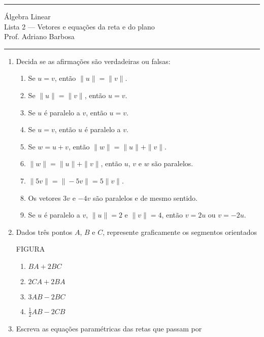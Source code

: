 \documentclass{article}
\begin{document}
\noindent{}\rule{\textwidth}{0.4pt}
\begin{center}
	\'{A}lgebra Linear\\
	Lista 2 --- Vetores e equa\c{c}\~oes da reta e do plano \\
	\vspace{0.2cm}
	Prof. Adriano Barbosa
\end{center}
\noindent{}\rule{\textwidth}{0.4pt}

\begin{enumerate}
\item Decida se as afirma\c{c}\~oes s\~ao verdadeiras ou falsas:

\begin{enumerate}
	\item Se $u = v$, ent\~ao $\|u\| = \|v\|$.
	\item Se $\|u\| = \|v\|$, ent\~ao $u = v$.
	\item Se $u$ \'e paralelo a $v$, ent\~ao $u = v$.
	\item Se $u = v$, ent\~ao $u$ \'e paralelo a $v$.
	\item Se $w = u + v$, ent\~ao $\|w\| = \|u\| + \|v\|$.
	\item $\|w\| = \|u\| + \|v\|$, ent\~ao $u$, $v$ e $w$ s\~ao paralelos.
	\item $\|5v\| = \|-5v\| = 5\|v\|$.
	\item Os vetores $3v$ e $-4v$ s\~ao paralelos e de mesmo sentido.
	\item Se $u$ \'e paralelo a $v$, $\|u\| = 2$ e $\|v\| = 4$, ent\~ao $v = 2u$ ou $v = -2u$.
\end{enumerate}

\item Dados tr\^es pontos $A$, $B$ e $C$, represente graficamente os segmentos orientados

FIGURA

\begin{enumerate}
	\item $BA + 2 BC$
	\item $2 CA + 2 BA$
	\item $3 AB - 2 BC$
	\item $\frac{1}{2} AB - 2 CB$
\end{enumerate}

\item Escreva as equa\c{c}\~oes param\'etricas das retas que passam por


\end{enumerate}
\end{document}
